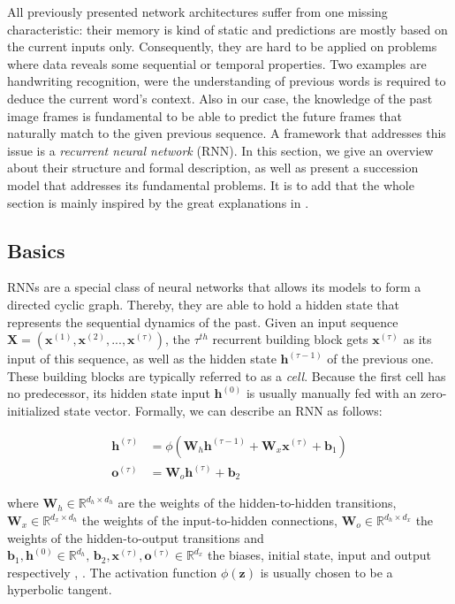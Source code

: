 All previously presented network architectures suffer from one missing characteristic: their memory is kind of static and predictions are mostly based on the current inputs only. Consequently, they are hard to be applied on problems where data reveals some sequential or temporal properties. Two examples are handwriting recognition, were the understanding of previous words is required to deduce the current word's context. Also in our case, the knowledge of the past image frames is fundamental to be able to predict the future frames that naturally match to the given previous sequence. A framework that addresses this issue is a \textit{recurrent neural network} (RNN). In this section, we give an overview about their structure and formal description, as well as present a succession model that addresses its fundamental problems. It is to add that the whole section is mainly inspired by the great explanations in \parencite{understand_lstm}.


\subsection{Basics}

RNNs are a special class of neural networks that allows its models to form a directed cyclic graph. Thereby, they are able to hold a hidden state that represents the sequential dynamics of the past. Given an input sequence $ \textbf{X} = (\textbf{x}^{(1)}, \textbf{x}^{(2)},..., \textbf{x}^{(\tau)}) $, the $ \tau^{th} $ recurrent building block gets $\textbf{x}^{(\tau)}$ as its input of this sequence, as well as the hidden state $\textbf{h}^{(\tau-1)}$ of the previous one. These building blocks are typically referred to as a \textit{cell}. Because the first cell has no predecessor, its hidden state input $ \textbf{h}^{(0)} $ is usually manually fed with an zero-initialized state vector. Formally, we can describe an RNN as follows:

\begin{equation} \label{eq:rnn}
\begin{aligned}
\textbf{h}^{(\tau)} &= \phi(\textbf{W}_{h} \textbf{h}^{(\tau-1)} + \textbf{W}_{x} \textbf{x}^{(\tau)} + \textbf{b}_1) \\
\textbf{o}^{(\tau)} &= \textbf{W}_{o} \textbf{h}^{(\tau)} + \textbf{b}_2
\end{aligned}
\end{equation}

where $ \textbf{W}_{h} \in \mathbb{R}^{d_h \times d_h} $ are the weights of the hidden-to-hidden transitions, $ \textbf{W}_{x} \in \mathbb{R}^{d_x \times d_h} $ the weights of the input-to-hidden connections, $ \textbf{W}_{o} \in \mathbb{R}^{d_h \times d_x} $ the weights of the hidden-to-output transitions and $ \textbf{b}_1, \textbf{h}^{(0)} \in \mathbb{R}^{d_h}, \, \textbf{b}_2, \textbf{x}^{(\tau)}, \textbf{o}^{(\tau)} \in \mathbb{R}^{d_x} $ the biases, initial state, input and output respectively \parencite[p. 2]{rnn-batchnorm}, \parencite[p. 381]{deep_learning}. The activation function $ \phi(\textbf{z}) $ is usually chosen to be a hyperbolic tangent.

